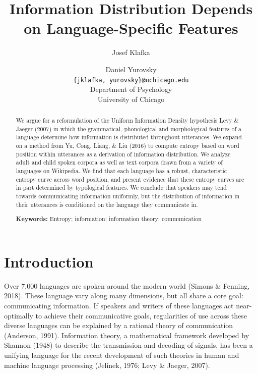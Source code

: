 \documentclass[10pt, letterpaper]{article}
\title{Information Distribution Depends on Language-Specific Features}
\author{Josef Klafka \and Daniel Yurovsky \\
        \texttt{\{jklafka, yurovsky\}@uchicago.edu} \\
       Department of Psychology \\ University of Chicago}
\begin{document}
\maketitle

\begin{abstract}
We argue for a reformulation of the Uniform Information Density
hypothesis Levy \& Jaeger (2007) in which the grammatical, phonological
and morphological features of a language determine how information is
distributed throughout utterances. We expand on a method from Yu, Cong,
Liang, \& Liu (2016) to compute entropy based on word position within
utterances as a derivation of information distribution. We analyze adult
and child spoken corpora as well as text corpora drawn from a variety of
languages on Wikipedia. We find that each language has a robust,
characteristic entropy curve across word position, and present evidence
that these entropy curves are in part determined by typological
features. We conclude that speakers may tend towards communicating
information uniformly, but the distribution of information in their
utterances is conditioned on the language they communicate in.

\textbf{Keywords:}
Entropy; information; information theory; communication
\end{abstract}

\hypertarget{introduction}{%
\section{Introduction}\label{introduction}}

Over 7,000 languages are spoken around the modern world (Simons \&
Fenning, 2018). These language vary along many dimensions, but all share
a core goal: communicating information. If speakers and writers of these
languages act near-optimally to achieve their communicative goals,
regularities of use across these diverse languages can be explained by a
rational theory of communication (Anderson, 1991). Information theory, a
mathematical framework developed by Shannon (1948) to describe the
transmission and decoding of signals, has been a unifying language for
the recent development of such theories in human and machine language
processing (Jelinek, 1976; Levy \& Jaeger, 2007).
\end{document}
